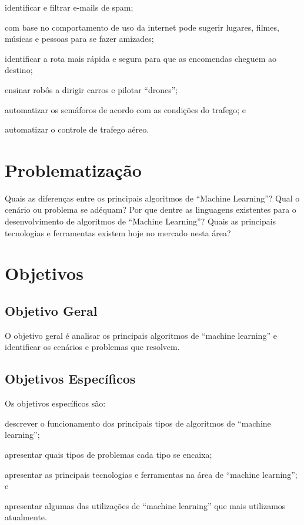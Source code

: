 	\begin{alineas}
			\item identificar e filtrar e-mails de spam;
			\item com base no comportamento de uso da internet pode sugerir lugares, filmes, músicas e pessoas para se fazer amizades;
			\item identificar a rota mais rápida e segura para que as encomendas cheguem ao destino;
			\item ensinar robôs a dirigir carros e pilotar “drones”;
			\item automatizar os semáforos de acordo com as condições do trafego; e
			\item automatizar o controle de trafego aéreo.
	\end{alineas}

\section{Problematização}
\label{sec:Problematizacao}

	Quais as diferenças entre os principais algoritmos de “Machine Learning”? Qual o cenário ou problema se adéquam? Por que dentre as linguagens existentes para o desenvolvimento de algoritmos de “Machine Learning”?  Quais as principais tecnologias e ferramentas existem hoje no mercado nesta área?

\section{Objetivos}
\label{sec:objetivos}
\subsection{Objetivo Geral}
\label{sec:objetivo-geral}

	O objetivo geral é analisar os principais algoritmos de “machine learning” e identificar os cenários e problemas que resolvem.


\subsection{Objetivos Específicos}
\label{sec:objetivos-especificos}

	Os objetivos específicos são: 

	\begin{alineas}
		\item descrever o funcionamento dos principais tipos de algoritmos de “machine learning”;
		\item apresentar quais tipos de problemas cada tipo se encaixa;
		\item apresentar as principais tecnologias e ferramentas na área de “machine learning”; e
		\item apresentar algumas das utilizações de “machine learning” que mais utilizamos atualmente.		
	\end{alineas}

